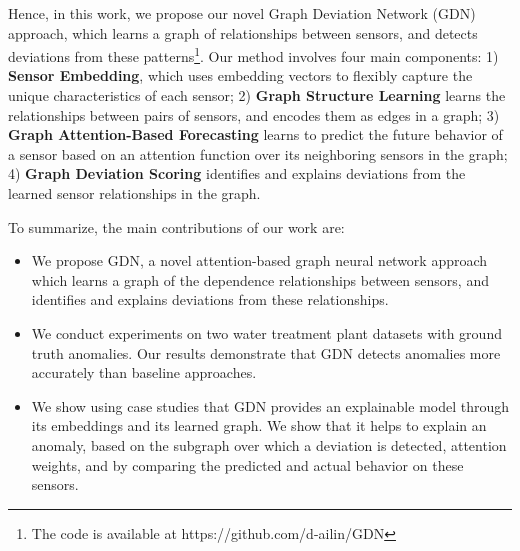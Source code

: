 \documentclass[letterpaper]{article} %
\begin{document}
Hence, in this work, we propose our novel Graph Deviation Network (\textsc{GDN}) approach, which learns a graph of relationships between sensors, and detects deviations from these patterns\footnote{The code is available at https://github.com/d-ailin/GDN}. Our method involves four main components: 1) \textbf{Sensor Embedding}, which uses embedding vectors to flexibly capture the unique characteristics of each sensor; 2) \textbf{Graph Structure Learning} learns the relationships between pairs of sensors, and encodes them as edges in a graph; 3) \textbf{Graph Attention-Based Forecasting} learns to predict the future behavior of a sensor based on an attention function over its neighboring sensors in the graph; 4) \textbf{Graph Deviation Scoring} identifies and explains deviations from the learned sensor relationships in the graph. 


To summarize, the main contributions of our work are:
\begin{itemize}
\item We propose \textsc{GDN}, a novel attention-based graph neural network approach which learns a graph of the dependence relationships between sensors, and identifies and explains deviations from these relationships. 
\item We conduct experiments on two water treatment plant datasets with ground truth anomalies. Our results demonstrate that \textsc{GDN} detects anomalies more accurately than baseline approaches.
\item We show using case studies that \textsc{GDN} provides an explainable model through its embeddings and its learned graph. We show that it helps to explain an anomaly, based on the subgraph over which a deviation is detected, attention weights, and by comparing the predicted and actual behavior on these sensors.
\end{itemize}
 
\end{document}
